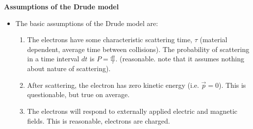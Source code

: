 \textbf{Assumptions of the Drude model}
\begin{itemize}
    \item The basic assumptions of the Drude model are:
    \begin{enumerate}
        \item The electrons have some characteristic scattering time, $\tau$ (material dependent, average time between collisions). The probability of scattering in a time interval $dt$ is $P = \frac{dt}{\tau}$. (reasonable. note that it assumes nothing about nature of scattering).
        \item After scattering, the electron has zero kinetic energy (i.e. $\vec{p} = 0$). This is questionable, but true on average.
        \item The electrons will respond to externally applied electric and magnetic fields. This is reasonable, electrons are charged.
    \end{enumerate}
\end{itemize}


